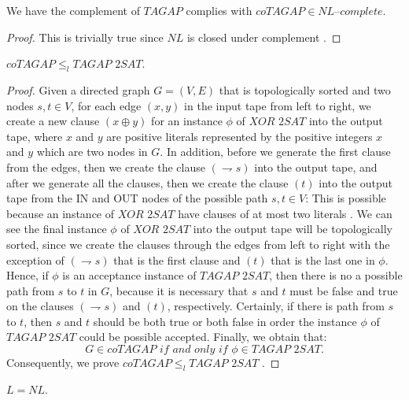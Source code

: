 \documentclass[a4paper,UKenglish,cleveref, autoref]{lipics-v2019}
\begin{document}
\begin{lemma}
\label{nl-complete}
We have the complement of $TAGAP$ complies with $coTAGAP \in \textit{NL--complete}$.
\end{lemma}

\begin{proof}
This is trivially true since $NL$ is closed under complement \cite{Pap03}.
\end{proof}

\begin{theorem}
\label{reduction}
$coTAGAP \leq_{l} \textit{TAGAP 2SAT}$.
\end{theorem}

\begin{proof}
Given a directed graph $G = (V, E)$ that is topologically sorted and two nodes $s, t \in V$, for each edge $(x, y)$ in the input tape from left to right, we create a new clause $(x \oplus y)$ for an instance $\phi$ of $\textit{XOR 2SAT}$ into the output tape, where $x$ and $y$ are positive literals represented by the positive integers $x$ and $y$ which are two nodes in $G$. In addition, before we generate the first clause from the edges, then we create the clause $(\rightharpoondown s)$ into the output tape, and after we generate all the clauses, then we create the clause $(t)$ into the output tape from the IN and OUT nodes of the possible path $s, t \in V$: This is possible because an instance of $\textit{XOR 2SAT}$ have clauses of at most two literals \cite{AR00}.
We can see the final instance $\phi$ of $\textit{XOR 2SAT}$ into the output tape will be topologically sorted, since we create the clauses through the edges from left to right with the exception of $(\rightharpoondown s)$ that is the first clause and $(t)$ that is the last one in $\phi$. Hence, if $\phi$ is an acceptance instance of $\textit{TAGAP 2SAT}$, then there is no a possible path from $s$ to $t$ in $G$, because it is necessary that $s$ and $t$ must be false and true on the clauses $(\rightharpoondown s)$ and $(t)$, respectively. Certainly, if there is path from $s$ to $t$, then $s$ and $t$ should be both true or both false in order the instance $\phi$ of $\textit{TAGAP 2SAT}$ could be possible accepted. Finally, we obtain that:
\[G \in coTAGAP \textit{ if and only if } \phi \in \textit{TAGAP 2SAT}.\]
Consequently, we prove $coTAGAP \leq_{l} \textit{TAGAP 2SAT}$ \cite{Pap03}.
\end{proof}

\begin{theorem}
\label{equal-L}
$L = NL$.
\end{theorem}
\end{document}
